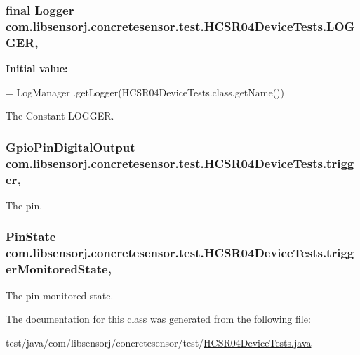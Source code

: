 \subsubsection[{L\+O\+G\+G\+E\+R}]{\setlength{\rightskip}{0pt plus 5cm}final Logger com.\+libsensorj.\+concretesensor.\+test.\+H\+C\+S\+R04\+Device\+Tests.\+L\+O\+G\+G\+E\+R\hspace{0.3cm}{\ttfamily [static]}, {\ttfamily [private]}}\label{classcom_1_1libsensorj_1_1concretesensor_1_1test_1_1HCSR04DeviceTests_a5bceb1147cb539bde62dad0d4f95e3cf}
{\bfseries Initial value\+:}
\begin{DoxyCode}
= LogManager
            .getLogger(HCSR04DeviceTests.class.getName())
\end{DoxyCode}
The Constant L\+O\+G\+G\+E\+R. \hypertarget{classcom_1_1libsensorj_1_1concretesensor_1_1test_1_1HCSR04DeviceTests_a1284eaac23d3414b8115c58e3daf10c0}{}
\subsubsection[{trigger}]{\setlength{\rightskip}{0pt plus 5cm}Gpio\+Pin\+Digital\+Output com.\+libsensorj.\+concretesensor.\+test.\+H\+C\+S\+R04\+Device\+Tests.\+trigger\hspace{0.3cm}{\ttfamily [static]}, {\ttfamily [private]}}\label{classcom_1_1libsensorj_1_1concretesensor_1_1test_1_1HCSR04DeviceTests_a1284eaac23d3414b8115c58e3daf10c0}
The pin. \hypertarget{classcom_1_1libsensorj_1_1concretesensor_1_1test_1_1HCSR04DeviceTests_ae6c52d9bfe127814bf0b2566d4671ef3}{}
\subsubsection[{trigger\+Monitored\+State}]{\setlength{\rightskip}{0pt plus 5cm}Pin\+State com.\+libsensorj.\+concretesensor.\+test.\+H\+C\+S\+R04\+Device\+Tests.\+trigger\+Monitored\+State\hspace{0.3cm}{\ttfamily [static]}, {\ttfamily [private]}}\label{classcom_1_1libsensorj_1_1concretesensor_1_1test_1_1HCSR04DeviceTests_ae6c52d9bfe127814bf0b2566d4671ef3}
The pin monitored state. 

The documentation for this class was generated from the following file\+:\begin{DoxyCompactItemize}
\item 
test/java/com/libsensorj/concretesensor/test/\hyperlink{HCSR04DeviceTests_8java}{H\+C\+S\+R04\+Device\+Tests.\+java}\end{DoxyCompactItemize}
